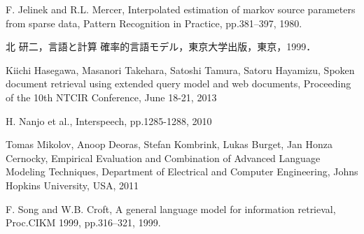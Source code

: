 \documentclass[a4paper,twocolumn,report,10.5pt]{jsbook}
\begin{document}
\begin{thebibliography}{99}
F. Jelinek and R.L. Mercer, Interpolated estimation of markov source parameters
from sparse data, Pattern Recognition in Practice, pp.381–397, 1980.



北 研二，言語と計算 確率的言語モデル，東京大学出版，東京，1999．

Kiichi Hasegawa, Masanori Takehara, Satoshi Tamura, Satoru Hayamizu, Spoken document retrieval using extended query model and web documents, Proceeding of the 10th NTCIR Conference, June 18-21, 2013


H. Nanjo et al., Interspeech, pp.1285-1288, 2010

Tomas Mikolov, Anoop Deoras, Stefan Kombrink, Lukas Burget, Jan Honza Cernocky, Empirical Evaluation and Combination of Advanced Language Modeling Techniques, Department of Electrical and Computer Engineering, Johns Hopkins University, USA, 2011

F. Song and W.B. Croft, A general language model for information retrieval, Proc.CIKM 1999, pp.316–321, 1999.








\end{thebibliography}
\end{document}
